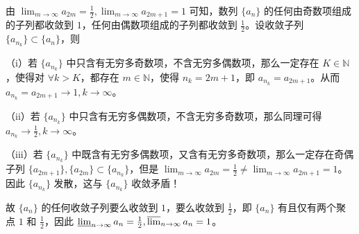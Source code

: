 \documentclass[../../main.tex]{subfiles}%
\begin{document}
\begin{remark}
由 $\lim_{m\rightarrow \infty}a_{2m}=\frac{1}{2}, \lim_{m\rightarrow \infty}a_{2m+1}=1$ 可知，数列 $\{ a_n \}$ 的任何由奇数项组成的子列都收敛到 $1$，任何由偶数项组成的子列都收敛到 $\frac{1}{2}$。设收敛子列 $\{ a_{n_k} \} \subset \{ a_n \}$，则

（i）若 $\{ a_{n_k} \}$ 中只含有无穷多奇数项，不含无穷多偶数项，那么一定存在 $K\in \mathbb{N}$，使得对 $\forall k>K$，都存在 $m\in \mathbb{N}$，使得 $n_k = 2m + 1$，即 $a_{n_k} = a_{2m + 1}$。从而 $a_{n_k} = a_{2m + 1} \rightarrow 1, k\rightarrow \infty$。

（ii）若 $\{ a_{n_k} \}$ 中只含有无穷多偶数项，不含无穷多奇数项，那么同理可得 $a_{n_k} \rightarrow \frac{1}{2}, k\rightarrow \infty$。

（iii）若 $\{ a_{n_k} \}$ 中既含有无穷多偶数项，又含有无穷多奇数项，那么一定存在奇偶子列 $\{ a_{2m + 1} \}, \{ a_{2m} \} \subset \{ a_{n_k} \}$，但是 $\lim_{m\rightarrow \infty}a_{2m} = \frac{1}{2} \neq \lim_{m\rightarrow \infty}a_{2m + 1} = 1$。因此 $\{ a_{n_k} \}$ 发散，这与 $\{ a_{n_k} \}$ 收敛矛盾！

故 $\{ a_n \}$ 的任何收敛子列要么收敛到 $1$，要么收敛到 $\frac{1}{2}$，即 $\{ a_n \}$ 有且仅有两个聚点 $1$ 和 $\frac{1}{2}$，因此 $\varliminf_{n\rightarrow \infty}a_n = \frac{1}{2}, \varlimsup_{n\rightarrow \infty}a_n = 1$。
\end{remark}
\end{document}
